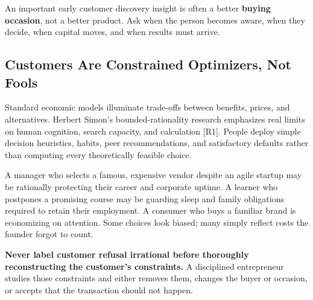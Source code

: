 An important early customer discovery insight is often a better \textbf{buying occasion}, not a better product. Ask when the person becomes aware, when they decide, when capital moves, and when results must arrive.

\subsection{Customers Are Constrained Optimizers, Not Fools}

Standard economic models illuminate trade-offs between benefits, prices, and alternatives. Herbert Simon's bounded-rationality research emphasizes real limits on human cognition, search capacity, and calculation [R1]. People deploy simple decision heuristics, habits, peer recommendations, and satisfactory defaults rather than computing every theoretically feasible choice.

A manager who selects a famous, expensive vendor despite an agile startup may be rationally protecting their career and corporate uptime. A learner who postpones a promising course may be guarding sleep and family obligations required to retain their employment. A consumer who buys a familiar brand is economizing on attention. Some choices look biased; many simply reflect costs the founder forgot to count.

\textbf{Never label customer refusal irrational before thoroughly reconstructing the customer's constraints.} A disciplined entrepreneur studies those constraints and either removes them, changes the buyer or occasion, or accepts that the transaction should not happen.
